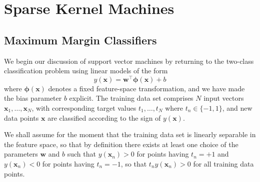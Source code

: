 \documentclass[12pt]{article}
\newcommand{\x}{\mathbf{x}}
\newcommand{\w}{\mathbf{w}}
\newcommand{\yOfX}{y\left(\x\right)}
\newcommand{\yOfXn}{y\left(\x_n\right)}
\newcommand{\phiOfX}{\mathbf{\phi}\left(\x\right)}
\begin{document}
\section{Sparse Kernel Machines}
\subsection{Maximum Margin Classifiers}

We begin our discussion of support vector machines by returning to the two-class
classification problem using linear models of the form
%
\begin{equation*}
  \yOfX = \w^\top\phiOfX + b
\end{equation*}
%
where $\phiOfX$ denotes a fixed feature-space transformation, and we have made
the bias parameter $b$ explicit. The training data set comprises $N$ input
vectors $\x_1,\hdots,\x_N$, with corresponding target values $t_1,\hdots,t_N$
where $t_n \in \{-1, 1\}$, and new data points $\x$ are classified
according to the sign of $\yOfX$.

We shall assume for the moment that the training data set is linearly separable
in the feature space, so that by definition there exists at least one choice of
the parameters $\w$ and $b$ such that $\yOfXn > 0$ for points having $t_n = +1$
and $\yOfXn < 0$ for points having $t_n = -1$, so that $t_n\yOfXn > 0$ for all
training data points.
\end{document}

